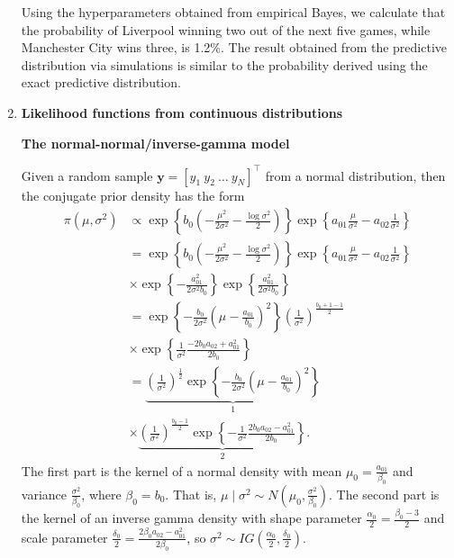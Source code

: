 \begin{enumerate}
Using the hyperparameters obtained from empirical Bayes, we calculate that the probability of Liverpool winning two out of the next five games, while Manchester City wins three, is 1.2\%. The result obtained from the predictive distribution via simulations is similar to the probability derived using the exact predictive distribution.

\item \textbf{Likelihood functions from continuous distributions}

\textbf{The normal-normal/inverse-gamma model}

Given a random sample $\bm{y}=[y_1 \ y_2 \ \dots \ y_N]^{\top}$ from a normal distribution, then the conjugate prior density has the form 
\begin{align}
	\pi(\mu,\sigma^2)&\propto \exp\left\{b_0\left(-\frac{\mu^2}{2\sigma^2}-\frac{\log \sigma^2}{2}\right)\right\}\exp\left\{a_{01}\frac{\mu}{\sigma^2}-a_{02}\frac{1}{\sigma^2}\right\}\nonumber\\
	&=\exp\left\{b_0\left(-\frac{\mu^2}{2\sigma^2}-\frac{\log \sigma^2}{2}\right)\right\}\exp\left\{a_{01}\frac{\mu}{\sigma^2}-a_{02}\frac{1}{\sigma^2}\right\}\nonumber\\
	&\times \exp\left\{-\frac{a_{01}^2}{2\sigma^2b_0}\right\}\exp\left\{\frac{a_{01}^2}{2\sigma^2b_0}\right\}\nonumber\\
	&=\exp\left\{-\frac{b_0}{2\sigma^2}\left(\mu-\frac{a_{01}}{b_0}\right)^2\right\}\left(\frac{1}{\sigma^2}\right)^{\frac{b_0+1-1}{2}}\nonumber\\
	&\times \exp\left\{\frac{1}{\sigma^2}\frac{-2b_0a_{02}+a_{01}^2}{2b_0}\right\}\nonumber\\
	&=\underbrace{\left(\frac{1}{\sigma^2}\right)^{\frac{1}{2}}\exp\left\{-\frac{b_0}{2\sigma^2}\left(\mu-\frac{a_{01}}{b_0}\right)^2\right\}}_{1}\nonumber\\
	&\times\underbrace{\left(\frac{1}{\sigma^2}\right)^{\frac{b_0-1}{2}}\exp\left\{-\frac{1}{\sigma^2}\frac{2b_0a_{02}-a_{01}^2}{2b_0}\right\}}_{2}.\nonumber
\end{align}
The first part is the kernel of a normal density with mean \( \mu_0 = \frac{a_{01}}{\beta_0} \) and variance \( \frac{\sigma^2}{\beta_0} \), where \( \beta_0 = b_0 \). That is, \( \mu \mid \sigma^2 \sim N\left(\mu_0, \frac{\sigma^2}{\beta_0}\right) \). The second part is the kernel of an inverse gamma density with shape parameter \( \frac{\alpha_0}{2} = \frac{\beta_0 - 3}{2} \) and scale parameter \( \frac{\delta_0}{2} = \frac{2\beta_0 a_{02} - a_{01}^2}{2\beta_0} \), so \( \sigma^2 \sim IG\left(\frac{\alpha_0}{2}, \frac{\delta_0}{2}\right) \).


\end{enumerate}
